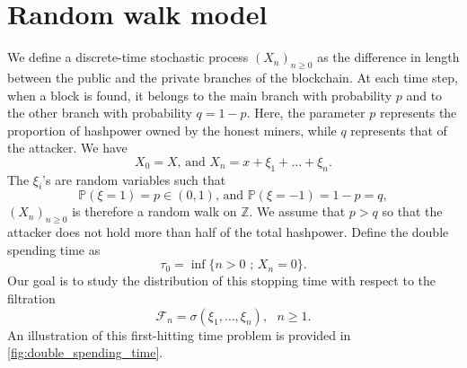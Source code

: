 \section{Random walk model}\label{sec:double_spending_rw}
We define a discrete-time stochastic process $(X_n)_{n\geq0}$ as the difference in length between the public and the private branches of the blockchain. At each time step, when a block is found, it belongs to the main branch with probability $p$ and to the other branch with probability $q=1-p$. Here, the parameter $p$ represents the proportion of hashpower owned by the honest miners, while $q$ represents that of the attacker. We have
$$
X_0 = X\text{, and  }X_n = x+\xi_1+\ldots+ \xi_n.
$$
The $\xi_i$'s are \iid random variables such that 
$$
\mathbb{P}(\xi=1) = p\in (0,1)\text{, and }\mathbb{P}(\xi=-1) = 1-p=q,
$$ 
$(X_n)_{n\geq0}$ is therefore a random walk on $\mathbb{Z}$. We assume that $p>q$ so that the attacker does not hold more than half of the total hashpower. Define the double spending time as 
$$
{\tau_0} = \inf\{n>0\text{ ; }X_n = 0\}.
$$
Our goal is to study the distribution of this stopping time with respect to the filtration 
$$
\mathcal{F}_n = \sigma(\xi_1,\ldots, \xi_n),\text{ }n\geq1.
$$ 
An illustration of this first-hitting time problem is provided in \cref{fig:double_spending_time}.
